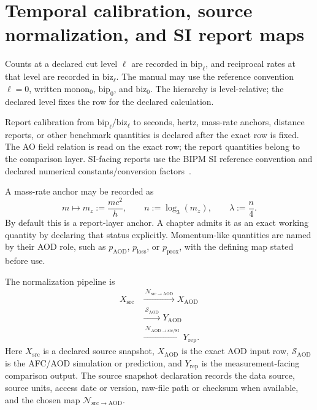 \section{Temporal calibration, source normalization, and SI report maps}
\label{app:manual-temporal-calibration}
\label{app:normalization-protocol}

Counts at a declared cut level \(\ell\) are recorded in \(\mathrm{bip}_{\ell}\), and reciprocal rates at that level are recorded in \(\mathrm{biz}_{\ell}\). The manual may use the reference convention \(\ell=0\), written \(\mathrm{monon}_0\), \(\mathrm{bip}_0\), and \(\mathrm{biz}_0\). The hierarchy is level-relative; the declared level fixes the row for the declared calculation.

Report calibration from \(\mathrm{bip}_{\ell}/\mathrm{biz}_{\ell}\) to seconds, hertz, mass-rate anchors, distance reports, or other benchmark quantities is declared after the exact row is fixed. The AO field relation is read on the exact row; the report quantities belong to the comparison layer. SI-facing reports use the BIPM SI reference convention and declared numerical constants/conversion factors~\cite{bipm_si_brochure_2025,nist_constants_complete}.

A mass-rate anchor may be recorded as
\[
m \mapsto m_z := \frac{mc^2}{h},
\qquad
n := \log_3(m_z),
\qquad
\lambda := \frac{n}{4}.
\]
By default this is a report-layer anchor. A chapter admits it as an exact working quantity by declaring that status explicitly. Momentum-like quantities are named by their AOD role, such as \(p_{\mathrm{AOD}}\), \(p_{\mathrm{loss}}\), or \(p_{\mathrm{prox}}\), with the defining map stated before use.

The normalization pipeline is
\[
\begin{aligned}
X_{\mathrm{src}}
&\xrightarrow{\ \mathcal N_{\mathrm{src}\to\mathrm{AOD}}\ }
X_{\mathrm{AOD}}\\
&\xrightarrow{\ \mathcal S_{\mathrm{AOD}}\ }
Y_{\mathrm{AOD}}\\
&\xrightarrow{\ \mathcal N_{\mathrm{AOD}\to\mathrm{src/SI}}\ }
Y_{\mathrm{rep}}.
\end{aligned}
\]
Here \(X_{\mathrm{src}}\) is a declared source snapshot, \(X_{\mathrm{AOD}}\) is the exact AOD input row, \(\mathcal S_{\mathrm{AOD}}\) is the AFC/AOD simulation or prediction, and \(Y_{\mathrm{rep}}\) is the measurement-facing comparison output. The source snapshot declaration records the data source, source units, access date or version, raw-file path or checksum when available, and the chosen map \(\mathcal N_{\mathrm{src}\to\mathrm{AOD}}\).

